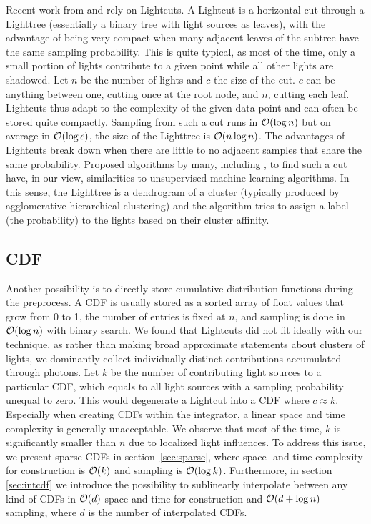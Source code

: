 Recent work from \textcite{Estevez} and \textcite{Vevoda} rely on Lightcuts. A Lightcut is a horizontal cut through a Lighttree (essentially a binary tree with light sources as leaves), with the advantage of being very compact when many adjacent leaves of the subtree have the same sampling probability. This is quite typical, as most of the time, only a small portion of lights contribute to a given point while all other lights are shadowed. Let $n$ be the number of lights and $c$ the size of the cut. $c$ can be anything between one, cutting once at the root node, and $n$, cutting each leaf. Lightcuts thus adapt to the complexity of the given data point and can often be stored quite compactly. Sampling from such a cut runs in $\mathcal{O}(\log{n})$ but on average in $\mathcal{O}(\log{c})$, the size of the Lighttree is $\mathcal{O}(n\log{n})$. The advantages of Lightcuts break down when there are little to no adjacent samples that share the same probability. Proposed algorithms by many, including \textcite{Estevez}, to find such a cut have, in our view, similarities to unsupervised machine learning algorithms. In this sense, the Lighttree is a dendrogram of a cluster (typically produced by agglomerative hierarchical clustering) and the algorithm tries to assign a label (the probability) to the lights based on their cluster affinity. 

\subsection{CDF}

Another possibility is to directly store cumulative distribution functions during the preprocess. A CDF is usually stored as a sorted array of float values that grow from 0 to 1, the number of entries is fixed at $n$, and sampling is done in $\mathcal{O}(\log{n})$ with binary search. We found that Lightcuts did not fit ideally with our technique, as rather than making broad approximate statements about clusters of lights, we dominantly collect individually distinct contributions accumulated through photons. Let $k$ be the number of contributing light sources to a particular CDF, which equals to all light sources with a sampling probability unequal to zero. This would degenerate a Lightcut into a CDF where $c \approx k$. Especially when creating CDFs within the integrator, a linear space and time complexity is generally unacceptable. We observe that most of the time, $k$ is significantly smaller than $n$ due to localized light influences. To address this issue, we present sparse CDFs in section~\ref{sec:sparse}, where space- and time complexity for construction is $\mathcal{O}(k)$ and sampling is $\mathcal{O}(\log{k})$. Furthermore, in section \ref{sec:intcdf} we introduce the possibility to sublinearly interpolate between any kind of CDFs in $\mathcal{O}(d)$ space and time for construction and $\mathcal{O}(d + \log{n})$ sampling, where $d$ is the number of interpolated CDFs.

